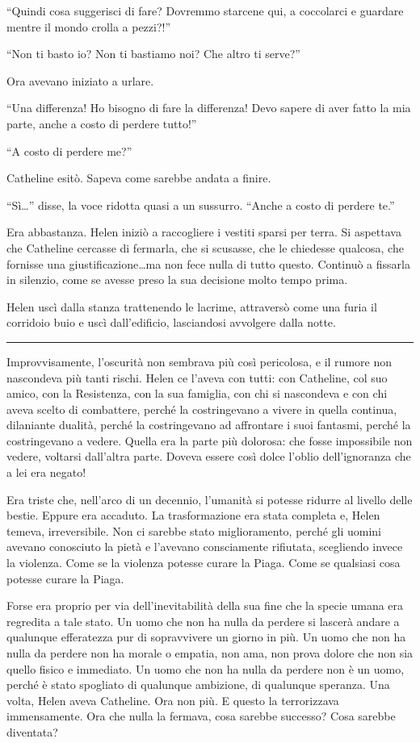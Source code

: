 \documentclass[a4paper,oneside,11pt]{memoir}
\begin{document}
``Quindi cosa suggerisci di fare? Dovremmo starcene qui, a coccolarci e guardare mentre il mondo
crolla a pezzi?!''

``Non ti basto io? Non ti bastiamo noi? Che altro ti serve?''

Ora avevano iniziato a urlare.

``Una differenza! Ho bisogno di fare la differenza! Devo sapere di aver fatto la mia parte, anche a
costo di perdere tutto!''

``A costo di perdere me?''

Catheline esitò. Sapeva come sarebbe andata a finire.

``Sì\dots'' disse, la voce ridotta quasi a un sussurro. ``Anche a costo di perdere te.''

Era abbastanza. Helen iniziò a raccogliere i vestiti sparsi per terra. Si aspettava che Catheline
cercasse di fermarla, che si scusasse, che le chiedesse qualcosa, che fornisse una
giustificazione\dots ma non fece nulla di tutto questo. Continuò a fissarla in silenzio, come se
avesse preso la sua decisione molto tempo prima.

Helen uscì dalla stanza trattenendo le lacrime, attraversò come una furia il corridoio buio e uscì
dall'edificio, lasciandosi avvolgere dalla notte.

\plainbreak{1}

Improvvisamente, l'oscurità non sembrava più così pericolosa, e il rumore non nascondeva più tanti
rischi. Helen ce l'aveva con tutti: con Catheline, col suo amico, con la Resistenza, con la sua
famiglia, con chi si nascondeva e con chi aveva scelto di combattere, perché la costringevano a
vivere in quella continua, dilaniante dualità, perché la costringevano ad affrontare i suoi
fantasmi, perché la costringevano a vedere. Quella era la parte più dolorosa: che fosse impossibile
non vedere, voltarsi dall'altra parte. Doveva essere così dolce l'oblio dell'ignoranza che a lei era
negato!

Era triste che, nell'arco di un decennio, l'umanità si potesse ridurre al livello delle bestie.
Eppure era accaduto. La trasformazione era stata completa e, Helen temeva, irreversibile. Non ci
sarebbe stato miglioramento, perché gli uomini avevano conosciuto la pietà e l'avevano consciamente
rifiutata, scegliendo invece la violenza. Come se la violenza potesse curare la Piaga. Come se
qualsiasi cosa potesse curare la Piaga.

Forse era proprio per via dell'inevitabilità della sua fine che la specie umana era regredita a tale
stato. Un uomo che non ha nulla da perdere si lascerà andare a qualunque efferatezza pur di
sopravvivere un giorno in più. Un uomo che non ha nulla da perdere non ha morale o empatia, non ama,
non prova dolore che non sia quello fisico e immediato. Un uomo che non ha nulla da perdere non è un
uomo, perché è stato spogliato di qualunque ambizione, di qualunque speranza. Una volta, Helen aveva
Catheline. Ora non più. E questo la terrorizzava immensamente. Ora che nulla la fermava, cosa
sarebbe successo? Cosa sarebbe diventata?
\end{document}
